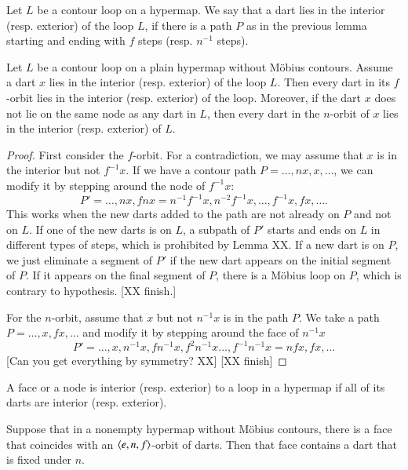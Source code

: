 \begin{definition}  Let $L$ be a contour loop on a hypermap.  We say that a dart
lies in the interior (resp. exterior) of the loop $L$, if there is a
path $P$ as in the previous lemma starting and ending with $f$ steps
(resp. $n^{-1}$ steps).
\end{definition}

\begin{lemma}  Let $L$ be a contour loop on a plain hypermap without
M\"obius contours.  Assume a dart $x$ lies in the interior (resp.
exterior) of the loop $L$. Then every dart in its $f$-orbit lies in
the interior (resp. exterior) of the loop.  Moreover, if the dart
$x$ does not lie on the same node as any dart in $L$, then every
dart in the $n$-orbit of $x$ lies in the interior (resp. exterior)
of $L$.
\end{lemma}

\begin{proof} First consider the $f$-orbit.
For a contradiction, we may assume that $x$ is in the interior but
not $f^{-1} x$.  If we have a contour path $P = \ldots,n  x,
x,\ldots$, we can modify it by stepping around the node of $f^{-1}
x$:
  $$P' = \ldots,n  x,f n  x = n^{-1}f^{-1} x,n^{-2}
f^{-1} x,\ldots,f^{-1} x,f x,\ldots.
    $$
This works when the new darts added to the path are not already on
$P$ and not on $L$.  If one of the new darts is on $L$, a subpath of
$P'$ starts and ends on $L$ in different types of steps, which is
prohibited by Lemma XX.  If a new dart is on $P$, we just eliminate
a segment of $P'$ if the new dart appears on the initial segment of
$P$.  If it appears on the final segment of $P$, there is a M\"obius
loop on $P$, which is contrary to hypothesis.  [XX finish.]


For the $n$-orbit, assume that $x$ but not $n^{-1} x$ is in the path
$P$.  We take a path $P = \ldots,x,f x,\ldots$ and modify it by
stepping around the face of $n^{-1} x$
    $$
    P' = \ldots,x,n^{-1}x,f n^{-1}x,f^2 n^{-1}x\ldots,f^{-1} n^{-1}
    x = n f x, f x,\ldots
    $$
[Can you get everything by symmetry? XX] [XX finish]
\end{proof}

\begin{definition}  A face or a node is interior (resp. exterior) to a
loop in a hypermap if all of its darts are interior (resp.
exterior).
\end{definition}

\begin{lemma} Suppose that in a nonempty hypermap without M\"obius contours,
there is a face that coincides with an $\langle e,n,f\rangle$-orbit of
darts.  Then that face contains a dart that is fixed under $n$.
\end{lemma}

